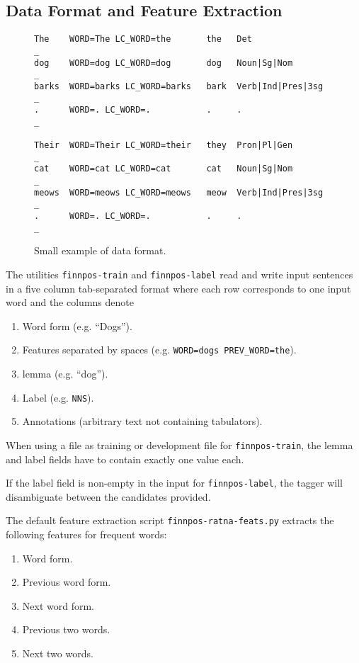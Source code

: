 \documentclass{llncs}
\begin{document}
\subsection{Data Format and Feature Extraction}

\begin{figure}
\begin{framed}
\begin{verbatim}
The    WORD=The LC_WORD=the       the   Det                _
dog    WORD=dog LC_WORD=dog       dog   Noun|Sg|Nom        _
barks  WORD=barks LC_WORD=barks   bark  Verb|Ind|Pres|3sg  _
.      WORD=. LC_WORD=.           .     .                  _

Their  WORD=Their LC_WORD=their   they  Pron|Pl|Gen        _
cat    WORD=cat LC_WORD=cat       cat   Noun|Sg|Nom        _
meows  WORD=meows LC_WORD=meows   meow  Verb|Ind|Pres|3sg  _
.      WORD=. LC_WORD=.           .     .                  _
\end{verbatim}
\end{framed}
\caption{Small example of data format.}
\end{figure}

The utilities {\tt finnpos-train} and {\tt finnpos-label} read and write input
sentences in a five column tab-separated format where each row
corresponds to one input word and the columns denote

\begin{enumerate}
  \item  Word form (e.g. ``Dogs'').
  \item  Features separated by spaces (e.g. \verb|WORD=dogs PREV_WORD=the|).
  \item  lemma (e.g. ``dog'').
  \item  Label (e.g. \verb|NNS|).
  \item  Annotations (arbitrary text not containing tabulators).
\end{enumerate}

When using a file as training or development file for {\tt finnpos-train}, the lemma and label fields have to contain exactly one value each.

If the label field is non-empty in the input for {\tt finnpos-label}, the tagger will disambiguate between the candidates provided.

The default feature extraction script {\tt finnpos-ratna-feats.py}
extracts the following features for frequent words:

\begin{enumerate}
\item Word form.
\item Previous word form.
\item Next word form.
\item Previous two words.
\item Next two words.
\end{enumerate}
\end{document}
